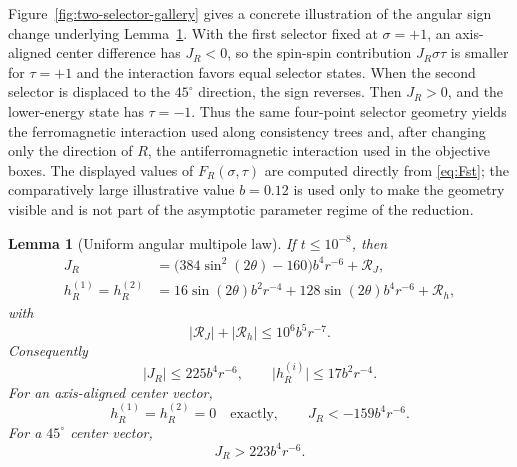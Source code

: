 \documentclass[12pt,a4paper]{article}
\newtheorem{lemma}[theorem]{Lemma}
\newcommand{\abs}[1]{\lvert #1\rvert}
\begin{document}
Figure~\ref{fig:two-selector-gallery} gives a concrete illustration of
the angular sign change underlying Lemma~\ref{lem:multipole}.  With the
first selector fixed at $\sigma=+1$, an axis-aligned center difference
has $J_R<0$, so the spin-spin contribution $J_R\sigma\tau$ is smaller
for $\tau=+1$ and the interaction favors equal selector states.  When
the second selector is displaced to the $45^\circ$ direction, the sign
reverses.  Then $J_R>0$, and the lower-energy state has $\tau=-1$.  Thus the
same four-point selector geometry yields the ferromagnetic interaction
used along consistency trees and, after changing only the direction of
$R$, the antiferromagnetic interaction used in the objective boxes.
The displayed values of $F_R(\sigma,\tau)$ are computed directly from
\eqref{eq:Fst}; the comparatively large illustrative value $b=0.12$ is
used only to make the geometry visible and is not part of the
asymptotic parameter regime of the reduction.

\begin{lemma}[Uniform angular multipole law]\label{lem:multipole}
If $t\le10^{-8}$, then
\begin{align}
 J_R&=\bigl(384\sin^2(2\theta)-160\bigr)b^4r^{-6}+\mathcal R_J,\label{eq:Jangle}\\
 h_R^{(1)}=h_R^{(2)}
 &=16\sin(2\theta)b^2r^{-4}
   +128\sin(2\theta)b^4r^{-6}+\mathcal R_h,\label{eq:hangle}
\end{align}
with
\begin{equation}\label{eq:rembound}
 \abs{\mathcal R_J}+\abs{\mathcal R_h}
 \le10^6b^5r^{-7}.
\end{equation}
Consequently
\begin{equation}\label{eq:uniformJ}
 \abs{J_R}\le225b^4r^{-6},\qquad
 \abs{h_R^{(i)}}\le17b^2r^{-4}.
\end{equation}
For an axis-aligned center vector,
\begin{equation}\label{eq:axis}
 h_R^{(1)}=h_R^{(2)}=0\quad\text{exactly},\qquad
 J_R<-159b^4r^{-6}.
\end{equation}
For a $45^\circ$ center vector,
\begin{equation}\label{eq:diagJ}
 J_R>223b^4r^{-6}.
\end{equation}
\end{lemma}
\end{document}
